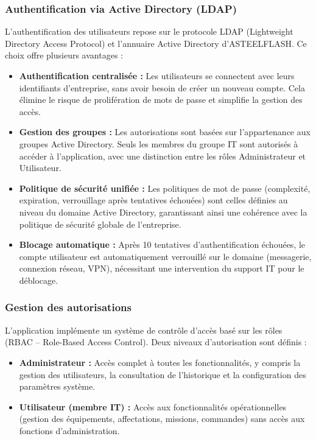 \subsubsection{Authentification via Active Directory (LDAP)}

L'authentification des utilisateurs repose sur le protocole LDAP (Lightweight Directory Access Protocol) et l'annuaire Active Directory d'ASTEELFLASH. Ce choix offre plusieurs avantages :

\begin{itemize}[label=\textbullet,font=\normalsize]
    \item \textbf{Authentification centralisée :} Les utilisateurs se connectent avec leurs identifiants d'entreprise, sans avoir besoin de créer un nouveau compte. Cela élimine le risque de prolifération de mots de passe et simplifie la gestion des accès.
    \item \textbf{Gestion des groupes :} Les autorisations sont basées sur l'appartenance aux groupes Active Directory. Seuls les membres du groupe IT sont autorisés à accéder à l'application, avec une distinction entre les rôles Administrateur et Utilisateur.
    \item \textbf{Politique de sécurité unifiée :} Les politiques de mot de passe (complexité, expiration, verrouillage après tentatives échouées) sont celles définies au niveau du domaine Active Directory, garantissant ainsi une cohérence avec la politique de sécurité globale de l'entreprise.
    \item \textbf{Blocage automatique :} Après 10 tentatives d'authentification échouées, le compte utilisateur est automatiquement verrouillé sur le domaine (messagerie, connexion réseau, VPN), nécessitant une intervention du support IT pour le déblocage.
\end{itemize}

\subsubsection{Gestion des autorisations}

L'application implémente un système de contrôle d'accès basé sur les rôles (RBAC -- Role-Based Access Control). Deux niveaux d'autorisation sont définis :

\begin{itemize}[label=\textbullet,font=\normalsize]
    \item \textbf{Administrateur :} Accès complet à toutes les fonctionnalités, y compris la gestion des utilisateurs, la consultation de l'historique et la configuration des paramètres système.
    \item \textbf{Utilisateur (membre IT) :} Accès aux fonctionnalités opérationnelles (gestion des équipements, affectations, missions, commandes) sans accès aux fonctions d'administration.
\end{itemize}

